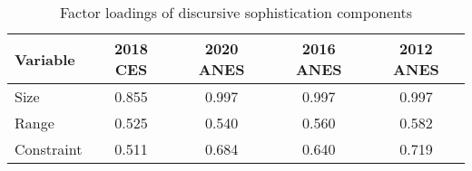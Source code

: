 \begin{table}[ht]
\centering
\begin{tabular}{lcccc}
  \hline
Variable & 2018 CES & 2020 ANES & 2016 ANES & 2012 ANES \\ 
  \hline
Size & 0.855 & 0.997 & 0.997 & 0.997 \\ 
  Range & 0.525 & 0.540 & 0.560 & 0.582 \\ 
  Constraint & 0.511 & 0.684 & 0.640 & 0.719 \\ 
   \hline
\end{tabular}
\caption{Factor loadings of discursive sophistication components} 
\label{tab:factload}
\end{table}
